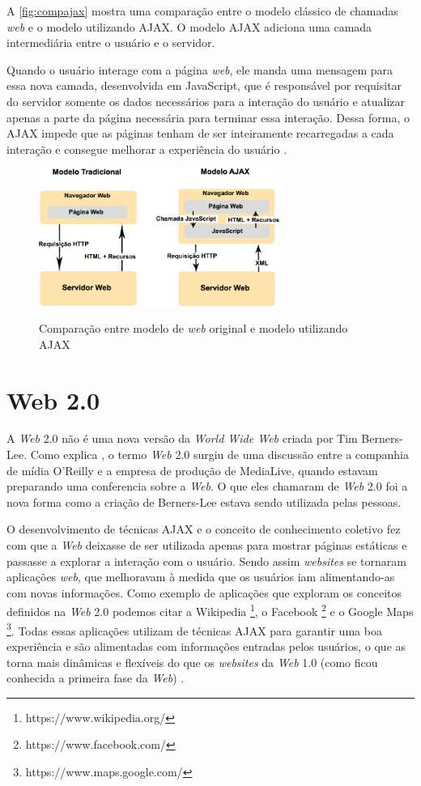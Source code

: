 A \autoref{fig:compajax} mostra uma comparação entre o modelo clássico de chamadas \textit{web} e o modelo utilizando AJAX. O modelo AJAX adiciona uma camada intermediária entre o usuário e o servidor.

Quando o usuário interage com a página \textit{web}, ele manda uma mensagem para essa nova camada, desenvolvida em JavaScript, que é responsável por requisitar do servidor somente os dados necessários para a interação do usuário e atualizar apenas a parte da página necessária para terminar essa interação. Dessa forma, o AJAX impede que as páginas tenham de ser inteiramente recarregadas a cada interação e consegue melhorar a experiência do usuário \cite{AJAX}.

\begin{figure}[!htb]
    \centering
    \caption{Comparação entre modelo de \textit{web} original e modelo utilizando AJAX}
    \includegraphics[width=0.7\textwidth]{./04-figuras/fund-teorica/comparacao_ajax}
    \label{fig:compajax}
\end{figure}


\section{Web 2.0}
\label{sec:web20}
A \textit{Web} 2.0 não é uma nova versão da \textit{World Wide Web} criada por Tim Berners-Lee. Como explica , o termo \textit{Web} 2.0 surgiu de uma discussão entre a companhia de mídia O'Reilly e a empresa de produção de MediaLive, quando estavam preparando uma conferencia sobre a \textit{Web}. O que eles chamaram de \textit{Web} 2.0 foi a nova forma como a criação de Berners-Lee estava sendo utilizada pelas pessoas.

O desenvolvimento de técnicas AJAX e o conceito de conhecimento coletivo fez com que a \textit{Web} deixasse de ser utilizada apenas para mostrar páginas estáticas e passasse a explorar a interação com o usuário. Sendo assim \textit{websites} se tornaram aplicações \textit{web}, que melhoravam à medida que os usuários iam alimentando-as com novas informações. Como exemplo de aplicações que exploram os conceitos definidos na \textit{Web} 2.0 podemos citar a Wikipedia \footnote{https://www.wikipedia.org/}, o Facebook \footnote{https://www.facebook.com/} e o Google Maps \footnote{https://www.maps.google.com/}. Todas essas aplicações utilizam de técnicas AJAX para garantir uma boa experiência e são alimentadas com informações entradas pelos usuários, o que as torna mais dinâmicas e flexíveis do que os \textit{websites} da \textit{Web} 1.0 (como ficou conhecida a primeira fase da \textit{Web}) \cite{Web20}.